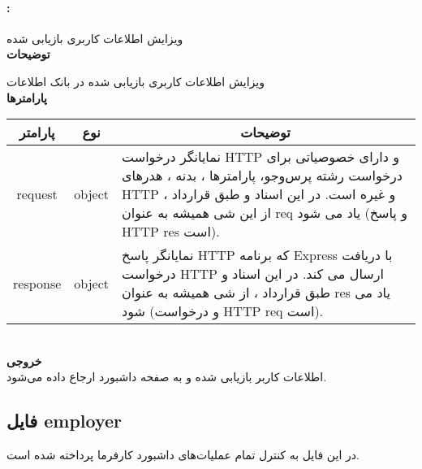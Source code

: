 \paragraph{:}
ویزایش اطلاعات کاربری بازیابی شده
\\
\textbf{توضیحات}
\hr
\begin{flushleft}
	\framebox[.9\textwidth][l]{
		\lr{
			\textcolor{type}{void}
			\textcolor{func}{postRecover}
			\textcolor{symb}{(}
			\textcolor{type}{object}
			\textcolor{arg}{request}
			\textcolor{symb}{,}
			\textcolor{type}{object}
			\textcolor{arg}{response}
			\textcolor{symb}{);}
		}
	}
\end{flushleft}
ویزایش اطلاعات کاربری بازیابی شده در بانک اطلاعات
\\
\textbf{پارامترها}
\hr \\[10pt]
\begin{tabular}{|m{4cm}|m{3cm}|m{10cm}|}
	\hline
	\multicolumn{1}{|c}{پارامتر}
	&
	\multicolumn{1}{|c}{نوع}
	&
	\multicolumn{1}{|c|}{توضیحات}
	\\
	\hline
	\multicolumn{1}{|c}{request}
	&
	\multicolumn{1}{|c|}{object}
	&
	نمایانگر درخواست HTTP و دارای خصوصیاتی برای درخواست رشته پرس‌و‌جو، پارامترها ، بدنه ، هدرهای HTTP و غیره است.
	در این اسناد و طبق قرارداد ، از این شی همیشه به عنوان req یاد می شود (و پاسخ HTTP res است).
	\\
	\hline
	\multicolumn{1}{|c}{response}
	&
	\multicolumn{1}{|c|}{object}
	&
	نمایانگر پاسخ HTTP که برنامه Express با دریافت درخواست HTTP ارسال می کند.
	در این اسناد و طبق قرارداد ، از شی همیشه به عنوان res یاد می شود (و درخواست HTTP req است).
	\\
	\hline
\end{tabular}
\\[10pt]
\textbf{خروجی}
\hr \\
اطلاعات کاربر بازیابی شده و به صفحه داشبورد ارجاع داده می‌شود.


\subsection{فایل employer}
در این فایل به کنترل تمام عملیات‌های داشبورد کارفرما پرداخته شده است.

